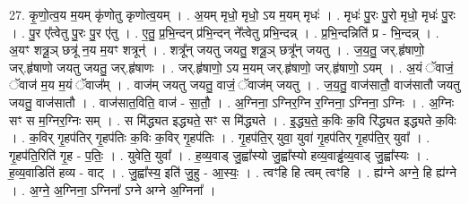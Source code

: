 \documentclass[17pt]{extarticle}
\begin{document}
27. कृ॒णो॒त्व॒य म॒यम् कृ॑णोतु कृणोत्व॒यम् । . अ॒यम् मृधो॒ मृधो॒ ऽय म॒यम् मृधः॑ । . मृधः॑ पु॒रः पु॒रो मृधो॒ मृधः॑ पु॒रः । . पु॒र ए᳚त्वेतु पु॒रः पु॒र ए॑तु । . ए॒तु॒ प्र॒भि॒न्दन् प्र॑भि॒न्दन् ने᳚त्वेतु प्रभि॒न्दन्न् । . प्र॒भि॒न्दन्निति॑ प्र - भि॒न्दन्न् । . अ॒यꣳ शत्रू॒ञ् छत्रू॑ न॒य म॒यꣳ शत्रून्॑ । . शत्रू᳚न् जयतु जयतु॒ शत्रू॒ञ् छत्रू᳚न् जयतु । . ज॒य॒तु॒ जर्.हृ॑षाणो॒ जर्.हृ॑षाणो जयतु जयतु॒ जर्.हृ॑षाणः । . जर्.हृ॑षाणो॒ ऽय म॒यम् जर्.हृ॑षाणो॒ जर्.हृ॑षाणो॒ ऽयम् । . अ॒यं ॅवाजं॒ ॅवाज॑ म॒य म॒यं ॅवाज᳚म् । . वाज॑म् जयतु जयतु॒ वाजं॒ ॅवाज॑म् जयतु । . ज॒य॒तु॒ वाज॑सातौ॒ वाज॑सातौ जयतु जयतु॒ वाज॑सातौ । . वाज॑सात॒विति॒ वाज॑ - सा॒तौ॒ । . अ॒ग्निना॒ ऽग्निर॒ग्नि र॒ग्निना॒ ऽग्निना॒ ऽग्निः । . अ॒ग्निः सꣳ स म॒ग्निर॒ग्निः सम् । . स मि॑द्ध्यत इद्ध्यते॒ सꣳ स मि॑द्ध्यते । . इ॒द्ध्य॒ते॒ क॒विः क॒वि रि॑द्ध्यत इद्ध्यते क॒विः । . क॒विर् गृ॒हप॑तिर् गृ॒हप॑तिः क॒विः क॒विर् गृ॒हप॑तिः । . गृ॒हप॑ति॒र् युवा॒ युवा॑ गृ॒हप॑तिर् गृ॒हप॑ति॒र् युवा᳚ । . गृ॒हप॑ति॒रिति॑ गृ॒ह - प॒तिः॒ । . युवेति॒ युवा᳚ । . ह॒व्य॒वाड् जु॒ह्वा᳚स्यो जु॒ह्वा᳚स्यो हव्य॒वाड्ढ॑व्य॒वाड् जु॒ह्वा᳚स्यः । . ह॒व्य॒वाडिति॑ हव्य - वाट् । . जु॒ह्वा᳚स्य॒ इति॑ जु॒हु - आ॒स्यः॒ । . त्वꣳहि हि त्वम् त्वꣳहि । . ह्य॑ग्ने अग्ने॒ हि ह्य॑ग्ने । . अ॒ग्ने॒ अ॒ग्निना॒ ऽग्निना᳚ ऽग्ने अग्ने अ॒ग्निना᳚ । \newline
\end{document}
